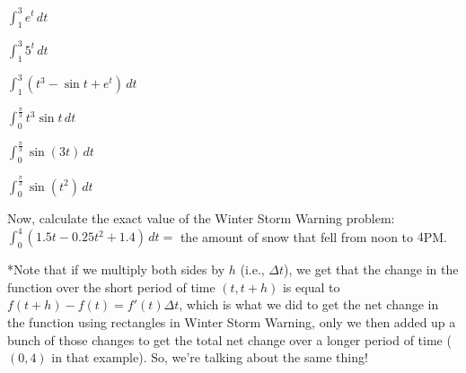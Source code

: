 \documentclass{ximera}
\begin{document}
\begin{problem}
$\int_1^3 e^t\, dt$
\end{problem}

\begin{problem}
$\int_1^3 5^t\, dt$
\end{problem}

\begin{problem}
$\int_1^3 (t^3 - \sin t + e^t)\, dt$
\end{problem}

\begin{problem}
$\int_0^{\frac{\pi}{3}} t^3 \sin t\, dt$
\end{problem}

\begin{problem}
$\int_0^{\frac{\pi}{3}} \sin(3t)\, dt$
\end{problem}

\begin{problem}
$\int_0^{\frac{\pi}{3}} \sin(t^2) \, dt$
\end{problem}

\begin{problem}
Now, calculate the exact value of the Winter Storm Warning problem: $\int_0^4 (1.5t-0.25t^2+1.4)\, dt =$   the amount of snow that fell from noon to $4$PM. 
\end{problem} 

*Note that if we multiply both sides by $h$ (i.e.,  $\Delta t$), we get that the change in the function over the short period of time $(t, t+h)$ is equal to  $f(t+h)-f(t) = f'(t) \Delta t$, which is what we did to get the net change in the function using rectangles in Winter Storm Warning, only we then added up a bunch of those changes to get the total net change over a longer period of time ($(0, 4)$ in that example).  So, we're talking about the same thing!
\end{document}
